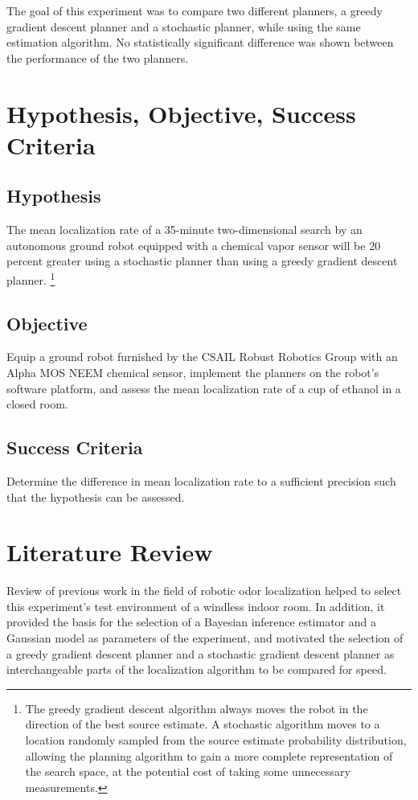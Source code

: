 \documentclass[submit, 12pt]{aiaa-pretty-modified}
\begin{document}
The goal of this experiment was to compare two different planners, a greedy
gradient descent planner and a stochastic planner, while using the same
estimation algorithm.  No statistically significant difference
was shown between the performance of the two planners.

\section{Hypothesis, Objective, Success Criteria}
\label{sec:hos}
\subsection*{Hypothesis} 
The mean localization rate of a 35-minute two-dimensional search by an
autonomous ground robot equipped with a chemical vapor sensor will be 20 percent
greater using a stochastic planner than using a greedy gradient descent planner.
\footnote{ The greedy gradient descent algorithm always moves the robot in the
  direction of the best source estimate. A stochastic algorithm moves to a
  location randomly sampled from the source estimate probability distribution,
  allowing the planning algorithm to gain a more complete representation of the
  search space, at the potential cost of taking some unnecessary measurements.}

\subsection*{Objective}
Equip a ground robot furnished by the CSAIL Robust Robotics Group with an Alpha MOS NEEM chemical sensor, implement the planners on the robot's software platform, and assess the mean localization rate of a cup of ethanol in a closed room.

\subsection*{Success Criteria} 
Determine the difference in mean localization rate to a sufficient precision such that the hypothesis can be assessed.

\section{Literature Review}
\label{sec:lit-review}
Review of previous work in the field of robotic odor localization helped to select
this experiment's test environment of a windless indoor room. In addition, it provided the basis for the selection of a Bayesian inference
estimator and a Gaussian model as parameters of the experiment, and
motivated the selection of a greedy gradient descent planner and a stochastic
gradient descent planner as interchangeable parts of the localization algorithm
to be compared for speed.
\end{document}
